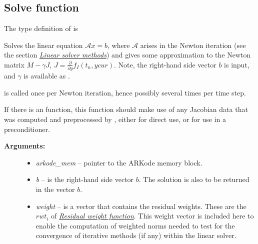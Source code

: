 \documentclass[letterpaper,10pt,english]{sphinxmanual}
\begin{document}
\subsection{Solve function}
\label{linear_solvers/custom:solve-function}
The type definition of {\hyperref[linear_solvers/custom:lsolve]{}} is

\begin{fulllineitems}
\label{linear_solvers/custom:lsolve}
Solves the linear equation ${\mathcal A} x = b$, where
${\mathcal A}$ arises  in the Newton iteration (see the
section {\hyperref[Mathematics:mathematics-linear]{\emph{Linear solver methods}}}) and gives some approximation to
the Newton matrix $M - \gamma J$, $J =
\frac{\partial}{\partial y} f_I(t_n, ycur)$. Note, the right-hand
side vector  $b$ is input, and $\gamma$ is available as
.

{\hyperref[linear_solvers/custom:lsolve]{}} is called once per Newton iteration, hence possibly
several times per time step.

If there is an {\hyperref[linear_solvers/custom:lsetup]{}} function, this {\hyperref[linear_solvers/custom:lsolve]{}}
function should make use of any Jacobian data that was computed and
preprocessed by {\hyperref[linear_solvers/custom:lsetup]{}}, either for direct use, or for
use in a preconditioner.
\begin{description}
\item[{\textbf{Arguments:}}] \leavevmode\begin{itemize}
\item {} 
\emph{arkode\_mem} -- pointer to the ARKode memory block.

\item {} 
\emph{b} -- is the right-hand side vector $b$. The solution
is also to be returned in the vector $b$.

\item {} 
\emph{weight} -- is a vector that contains the residual weights. These
are the $rwt_i$ of {\hyperref[c_interface/User_supplied:cinterface-residualweight]{\emph{Residual weight function}}}.
This weight vector is included here to enable the computation
of weighted norms needed to test for the convergence of
iterative methods (if any) within the linear solver.


\end{itemize}
\end{description}
\end{fulllineitems}
\end{document}

